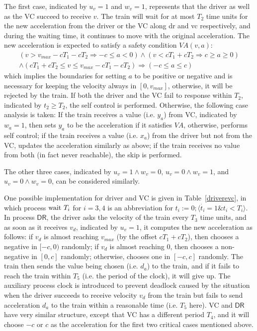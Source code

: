 \documentclass{llncs}
\newcommand{\pwait}{\textmd{wait}}
\begin{document}
The first case, indicated by $u_v=1$ and $w_v=1$,
represents that the driver as well as the VC succeed to receive $v$.
The train will wait for at most $T_2$ time units
for
the new acceleration from the  driver or the VC along \textsf{dr} and \textsf{vc} respectively, and during the waiting time, it
continues to move with the original acceleration. The new acceleration is expected to satisfy a
 safety condition $VA(v, a)$:
 \vspace{-0.5em}
 \[\begin{array}{l}
 (v > v_{max} - cT_1 - cT_2 \Rightarrow -c \leq a <0) \wedge
  (v < cT_1 + cT_2 \Rightarrow c \geq a \geq 0) \\
 \wedge(cT_1 + cT_2 \leq v \leq v_{max} - cT_1 - cT_2) \Rightarrow (-c \leq a \leq c)
 \end{array}\]
which implies the boundaries for setting $a$ to be positive or negative and is necessary for keeping the velocity always in
$[0, v_{max}]$, otherwise, it will be rejected by the train.
If both the driver and the VC fail to response within $T_2$, indicated by $t_2 \geq T_2$,
 the self control is performed.
 Otherwise, the following case analysis is taken:
 If the train receives a value (i.e. $y_a$) from  VC,
 indicated by $w_a=1$, then sets $y_a$
 to be the acceleration if it satisfies $VA$,
otherwise, performs self control; if the train receives a value (i.e. $x_a$) from the driver but not from
the VC, updates the acceleration similarly as above; if
the train receives no value from both (in fact never reachable), the skip is performed.





The  other three cases, indicated by $u_v=1 \wedge w_v=0$, $u_v=0 \wedge w_v=1$, and $u_v=0 \wedge w_v=0$,
can be considered similarly.








One possible implementation for driver and VC is given in Table~\ref{driverevc}, in which
process $\pwait \ T_i$ for $i=3, 4$ is an abbreviation for
$t_i :=0;  \langle \dot{t_i} = 1 \& t_i < T_i\rangle$. In process
$\textsf{DR}$, the driver asks the velocity of the train every $T_3$ time units, and as soon as
it receives $v_d$, indicated by $u_v=1$, it computes the new acceleration as follows:
 if $v_d$ is almost reaching $v_{max}$ (by the offset $cT_1 + cT_2$), then chooses a negative
in $[-c, 0)$ randomly; if
$v_d$ is almost reaching 0, then chooses a non-negative in $[0, c]$  randomly;
otherwise, chooses one in $[-c, c]$ randomly.
 The train then sends the value being chosen (i.e. $d_a$) to the train, and if it fails to reach the train
within $T_5$ (i.e. the period of the clock), it will give up. The auxiliary process
\textsf{clock} is introduced to prevent deadlock caused by the situation when the driver succeeds to receive velocity $v_d$ from the train but fails to send acceleration $d_a$ to the train within a reasonable time (i.e. $T_5$ here).
\textsf{VC}  and $\textsf{DR}$ have very similar structure, except that
\textsf{VC} has a different period $T_4$, and it
will choose $-c$ or $ c$ as the acceleration for the first two critical cases mentioned above.
\end{document}
